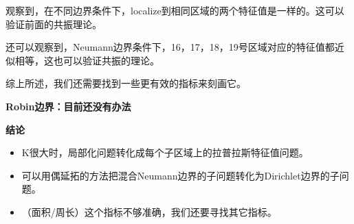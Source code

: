 \documentclass[12pt,a4paper]{article}
\begin{document}
观察到，在不同边界条件下，localize到相同区域的两个特征值是一样的。这可以验证前面的共振理论。

还可以观察到，Neumann边界条件下，16，17，18，19号区域对应的特征值都近似相等，这也可以验证共振的理论。

综上所述，我们还需要找到一些更有效的指标来刻画它。

\textbf{Robin边界：目前还没有办法}

\textbf{结论}
\begin{itemize}
\item K很大时，局部化问题转化成每个子区域上的拉普拉斯特征值问题。
\item 可以用偶延拓的方法把混合Neumann边界的子问题转化为Dirichlet边界的子问题。
\item （面积/周长）这个指标不够准确，我们还要寻找其它指标。
\end{itemize}
\end{document}
